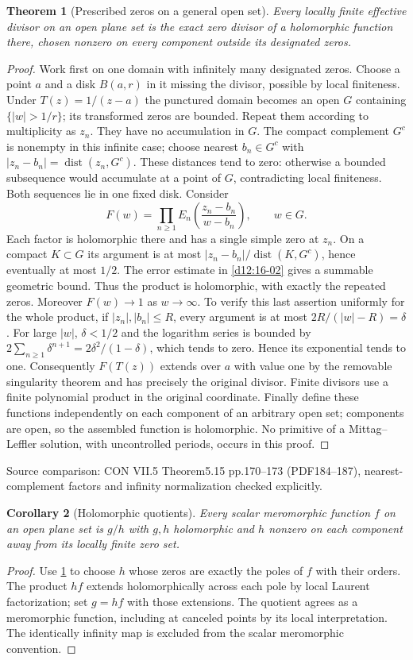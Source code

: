 \documentclass[11pt,a4paper,openany]{book}
\newtheorem{theorem}{Theorem}[chapter]
\newtheorem{corollary}[theorem]{Corollary}
\theoremstyle{definition}
\theoremstyle{remark}\newtheorem{remark}[theorem]{Remark}
\DeclareMathOperator{\dist}{dist}\DeclareMathOperator{\ord}{ord}
\newcommand{\family}[1]{}
\newcommand{\source}[1]{\par\begingroup\small\sffamily\color{black!65}Source comparison: #1\par\endgroup}
\begin{document}
\begin{theorem}[Prescribed zeros on a general open set]\family{D12.16.05}\label{d12:16-05}
Every locally finite effective divisor on an open plane set is the exact zero divisor of a holomorphic function there, chosen nonzero on every component outside its designated zeros.
\end{theorem}
\begin{proof}
Work first on one domain with infinitely many designated zeros. Choose a point $a$ and a disk $B(a,r)$ in it missing the divisor, possible by local finiteness. Under $T(z)=1/(z-a)$ the punctured domain becomes an open $G$ containing $\{|w|>1/r\}$; its transformed zeros are bounded. Repeat them according to multiplicity as $z_n$. They have no accumulation in $G$. The compact complement $G^c$ is nonempty in this infinite case; choose nearest $b_n\in G^c$ with $|z_n-b_n|=\dist(z_n,G^c)$. These distances tend to zero: otherwise a bounded subsequence would accumulate at a point of $G$, contradicting local finiteness. Both sequences lie in one fixed disk.
Consider
\[
 F(w)=\prod_{n\ge1}E_n\left(\frac{z_n-b_n}{w-b_n}\right),\qquad w\in G.
\]
Each factor is holomorphic there and has a single simple zero at $z_n$. On a compact $K\subset G$ its argument is at most $|z_n-b_n|/\dist(K,G^c)$, hence eventually at most $1/2$. The error estimate in \cref{d12:16-02} gives a summable geometric bound. Thus the product is holomorphic, with exactly the repeated zeros. Moreover $F(w)\to1$ as $w\to\infty$. To verify this last assertion uniformly for the whole product, if $|z_n|,|b_n|\le R$, every argument is at most $2R/(|w|-R)=\delta$. For large $|w|$, $\delta<1/2$ and the logarithm series is bounded by $2\sum_{n\ge1}\delta^{n+1}=2\delta^2/(1-\delta)$, which tends to zero. Hence its exponential tends to one. Consequently $F(T(z))$ extends over $a$ with value one by the removable singularity theorem and has precisely the original divisor. Finite divisors use a finite polynomial product in the original coordinate. Finally define these functions independently on each component of an arbitrary open set; components are open, so the assembled function is holomorphic. No primitive of a Mittag--Leffler solution, with uncontrolled periods, occurs in this proof.
\end{proof}
\source{CON VII.5 Theorem5.15 pp.170--173 (PDF184--187), nearest-complement factors and infinity normalization checked explicitly.}

\begin{corollary}[Holomorphic quotients]\family{D12.16.06}\label{d12:16-06}
Every scalar meromorphic function $f$ on an open plane set is $g/h$ with $g,h$ holomorphic and $h$ nonzero on each component away from its locally finite zero set.
\end{corollary}
\begin{proof}
Use \cref{d12:16-05} to choose $h$ whose zeros are exactly the poles of $f$ with their orders. The product $hf$ extends holomorphically across each pole by local Laurent factorization; set $g=hf$ with those extensions. The quotient agrees as a meromorphic function, including at canceled points by its local interpretation. The identically infinity map is excluded from the scalar meromorphic convention.
\end{proof}
\end{document}
